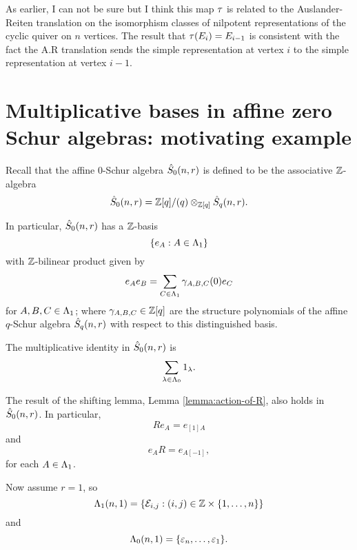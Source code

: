 \documentclass[a4paper, 11pt]{report}
\begin{document}
{\color{blue}As earlier, I can not be sure but I think this map $\rotation{}$ is related to the Auslander-Reiten translation on the isomorphism classes of nilpotent representations of the cyclic quiver on $n$ vertices. The result that $\rotation{(E_i)}=  E_{i-1}$ is consistent with the fact the A.R translation sends the simple representation at vertex $i$ to the simple representation at vertex $i-1$.}

\section{Multiplicative bases in affine zero Schur algebras: motivating example}

Recall that the affine $0$-Schur algebra $\zeroschur$ is defined to be the associative $\integers$-algebra
\begin{equation*}
\zeroschur = {\integers[q]}/{(q)}\otimes_{\integers[q]} \qschur.
\end{equation*}

In particular, $\zeroschur$ has a $\integers$-basis
\begin{equation*}
\{e_A:A\in\matrices\}
\end{equation*}
with $\integers$-bilinear product given by
\begin{equation*}
e_A e_B = \sum_{C\in\matrices} \gamma_{A,B,C}(0) e_C
\end{equation*}
for $A,B,C\in\matrices$; where $\gamma_{A,B,C}\in\integers[q]$ are the structure polynomials of the affine $q$-Schur algebra $\qschur$ with respect to this distinguished basis.

The multiplicative identity in $\zeroschur$ is
\begin{equation*}
\sum_{\lambda\in\compositions} 1_\lambda.
\end{equation*}

The result of the shifting lemma, Lemma \ref{lemma:action-of-R}, also holds in $\zeroschur$. In particular,
\begin{equation*}
Re_A = e_{[1]A}
\end{equation*}
and
\begin{equation*}
e_A R = e_{A[-1]},
\end{equation*}
for each $A\in\matrices$.

Now assume $r=1$, so
\begin{equation*}
\matrices[(n,1)] = \{\elem{i}{j}:(i,j)\in\integers\times\{1,\ldots,n\}\}
\end{equation*}
and
\begin{equation*}
\compositions[(n,1)] = \{\epsilon_n,\ldots,\epsilon_1\}.
\end{equation*}
\end{document}
